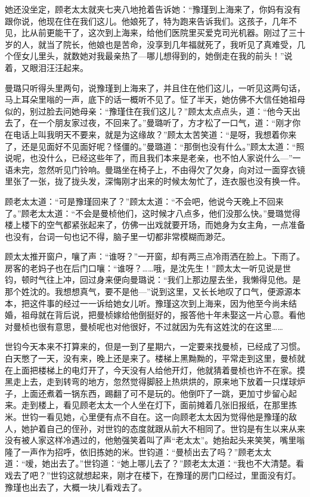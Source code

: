 \par 她还没坐定，顾老太太就夹七夹八地抢着告诉她：“豫瑾到上海来了，你妈有没有跟你说，他现在住在我们这儿。他娘死了，特为跑来告诉我们。这孩子，几年不见，比从前更能干了，这次到上海来，给他们医院里买爱克司光机器。刚过了三十岁的人，就当了院长，他娘也是苦命，没享到几年福就死了，我听见了真难受，几个侄女儿里头，就数她对我最亲热了—哪儿想得到的，她倒走在我的前头！”说着，又眼泪汪汪起来。
\par 曼璐只听得头里两句，说豫瑾到上海来了，并且住在他们这儿，一听见这两句话，马上耳朵里嗡的一声，底下的话一概听不见了。怔了半天，她仿佛不大信任她祖母似的，别过脸去问她母亲：“豫瑾住在我们这儿？”顾太太点点头，道：“他今天出去了，在一个朋友家过夜，不回来了。”曼璐听了，方才松了一口气，道：“刚才你在电话上叫我明天不要来，就是为这缘故？”顾太太苦笑道：“是呀，我想着你来了，还是见面好不见面好呢？怪僵的。”曼璐道：“那倒也没有什么。”顾太太道：“照说呢，也没什么，已经这些年了，而且我们本来是老亲，也不怕人家说什么—”一语未完，忽然听见门铃响。曼璐坐在椅子上，不由得欠了欠身，向对过一面穿衣镜里张了一张，拢了拢头发，深悔刚才出来的时候太匆忙了，连衣服也没有换一件。
\par 顾老太太道：“可是豫瑾回来了？”顾太太道：“不会吧，他说今天晚上不回来了。”顾老太太道：“不会是曼桢他们，这时候才八点多，他们没那么快。”曼璐觉得楼上楼下的空气都紧张起来了，仿佛一出戏就要开场，而她身为女主角，一点准备也没有，台词一句也记不得，脑子里一切都非常模糊而渺茫。
\par 顾太太推开窗户，嚷了声：“谁呀？”一开窗，却有两三点冷雨洒在脸上。下雨了。房客的老妈子也在后门口嚷：“谁呀？……哦，是沈先生！”顾太太一听见说是世钧，顿时气往上冲，回过身来便向曼璐说：“我们上那边屋去坐，我懒得见他。是那个姓沈的。我想想真气，要不是他—”说到这里，又长长地叹了口气，便源源本本，把这件事的经过一一诉给她女儿听。豫瑾这次到上海来，因为他至今尚未结婚，祖母就在背后说，把曼桢嫁给他倒挺好的，报答他十年未娶这一片心意。看他对曼桢也很有意思，曼桢呢也对他很好，不过就因为先有这姓沈的在这里……
\par 世钧今天本来不打算来的，但是一到了星期六，一定要来找曼桢，已经成了习惯。白天憋了一天，没有来，晚上还是来了。楼梯上黑黝黝的，平常走到这里，曼桢就在上面把楼梯上的电灯开了，今天没有人给他开灯，他就猜着曼桢也许不在家。摸黑走上去，走到转弯的地方，忽然觉得脚胫上热烘烘的，原来地下放着一只煤球炉子，上面还煮着一锅东西，踢翻了可不是玩的。他倒吓了一跳，更加寸步留心起来。走到楼上，看见顾老太太一个人坐在灯下，面前摊着几张旧报纸，在那里拣米。世钧一看见她，心里便有点不自在。这一向顾老太太因为觉得他是豫瑾的敌人，她护着自己的侄孙，对世钧的态度就跟从前大不相同了。世钧是有生以来从来没有被人家这样冷遇过的，他勉强笑着叫了声“老太太”。她抬起头来笑笑，嘴里嗡隆了一声作为招呼，依旧拣她的米。世钧道：“曼桢出去了吗？”顾老太太道：“嗳，她出去了。”世钧道：“她上哪儿去了？”顾老太太道：“我也不大清楚。看戏去了吧？”世钧这就想起来，刚才在楼下，在豫瑾的房门口经过，里面没有灯。豫瑾也出去了，大概一块儿看戏去了。
